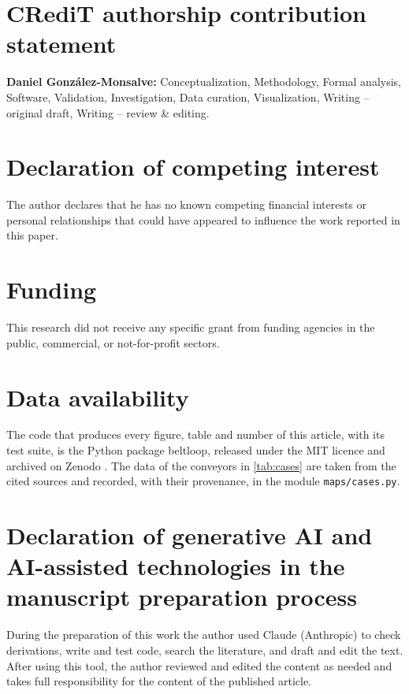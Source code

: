 \section*{CRediT authorship contribution statement}
\textbf{Daniel González-Monsalve:} Conceptualization, Methodology, Formal analysis,
Software, Validation, Investigation, Data curation, Visualization, Writing -- original
draft, Writing -- review \& editing.

\section*{Declaration of competing interest}
The author declares that he has no known competing financial interests or personal
relationships that could have appeared to influence the work reported in this paper.

\section*{Funding}
This research did not receive any specific grant from funding agencies in the public,
commercial, or not-for-profit sectors.

\section*{Data availability}
The code that produces every figure, table and number of this article, with its test
suite, is the Python package beltloop, released under the MIT licence and archived on
Zenodo \citep{beltloopzenodo}. The data of the conveyors in \cref{tab:cases} are taken from the
cited sources and recorded, with their provenance, in the module \texttt{maps/cases.py}.

\section*{Declaration of generative AI and AI-assisted technologies in the manuscript preparation process}
During the preparation of this work the author used Claude (Anthropic) to check
derivations, write and test code, search the literature, and draft and edit the text. After
using this tool, the author reviewed and edited the content as needed and takes full
responsibility for the content of the published article.
